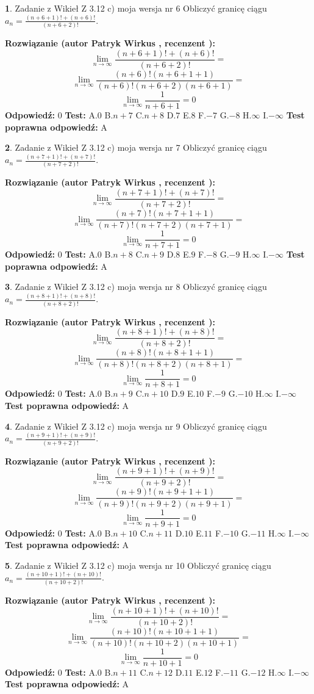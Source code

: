 \documentclass[12pt, a4paper]{article}
\theoremstyle{definition} %
\newtheorem{zad}{}
\newcommand{\zadStart}[1]{\begin{zad}#1\newline}
\newcommand{\zadStop}{\end{zad}}
\newcommand{\rozwStart}[2]{\noindent \textbf{Rozwiązanie (autor #1 , recenzent #2): }\newline}
\newcommand{\rozwStop}{\newline}
\newcommand{\odpStart}{\noindent \textbf{Odpowiedź:}\newline}
\newcommand{\odpStop}{\newline}
\newcommand{\testStart}{\noindent \textbf{Test:}\newline}
\newcommand{\testStop}{\newline}
\newcommand{\kluczStart}{\noindent \textbf{Test poprawna odpowiedź:}\newline}
\newcommand{\kluczStop}{\newline}
\begin{document}
\zadStart{Zadanie z Wikieł Z 3.12 c) moja wersja nr 6}
Obliczyć granicę ciągu $a_{n}=\frac{(n+6+1)!+(n+6)!}{(n+6+2)!}$.
\zadStop
\rozwStart{Patryk Wirkus}{}
$$\lim\limits_{n\to\infty}\frac{(n+6+1)!+(n+6)!}{(n+6+2)!}=$$
$$\lim\limits_{n\to\infty}\frac{(n+6)!(n+6+1+1)}{(n+6)!(n+6+2)(n+6+1)}=$$
$$\lim\limits_{n\to\infty}\frac{1}{n+6+1}= 0$$
\rozwStop
\odpStart
$0$
\odpStop
\testStart
A.$0$
B.$n+7$
C.$n+8$
D.$7$
E.$8$
F.$-7$
G.$-8$
H.$\infty$
I.$-\infty$
\testStop
\kluczStart
A
\kluczStop



\zadStart{Zadanie z Wikieł Z 3.12 c) moja wersja nr 7}
Obliczyć granicę ciągu $a_{n}=\frac{(n+7+1)!+(n+7)!}{(n+7+2)!}$.
\zadStop
\rozwStart{Patryk Wirkus}{}
$$\lim\limits_{n\to\infty}\frac{(n+7+1)!+(n+7)!}{(n+7+2)!}=$$
$$\lim\limits_{n\to\infty}\frac{(n+7)!(n+7+1+1)}{(n+7)!(n+7+2)(n+7+1)}=$$
$$\lim\limits_{n\to\infty}\frac{1}{n+7+1}= 0$$
\rozwStop
\odpStart
$0$
\odpStop
\testStart
A.$0$
B.$n+8$
C.$n+9$
D.$8$
E.$9$
F.$-8$
G.$-9$
H.$\infty$
I.$-\infty$
\testStop
\kluczStart
A
\kluczStop



\zadStart{Zadanie z Wikieł Z 3.12 c) moja wersja nr 8}
Obliczyć granicę ciągu $a_{n}=\frac{(n+8+1)!+(n+8)!}{(n+8+2)!}$.
\zadStop
\rozwStart{Patryk Wirkus}{}
$$\lim\limits_{n\to\infty}\frac{(n+8+1)!+(n+8)!}{(n+8+2)!}=$$
$$\lim\limits_{n\to\infty}\frac{(n+8)!(n+8+1+1)}{(n+8)!(n+8+2)(n+8+1)}=$$
$$\lim\limits_{n\to\infty}\frac{1}{n+8+1}= 0$$
\rozwStop
\odpStart
$0$
\odpStop
\testStart
A.$0$
B.$n+9$
C.$n+10$
D.$9$
E.$10$
F.$-9$
G.$-10$
H.$\infty$
I.$-\infty$
\testStop
\kluczStart
A
\kluczStop



\zadStart{Zadanie z Wikieł Z 3.12 c) moja wersja nr 9}
Obliczyć granicę ciągu $a_{n}=\frac{(n+9+1)!+(n+9)!}{(n+9+2)!}$.
\zadStop
\rozwStart{Patryk Wirkus}{}
$$\lim\limits_{n\to\infty}\frac{(n+9+1)!+(n+9)!}{(n+9+2)!}=$$
$$\lim\limits_{n\to\infty}\frac{(n+9)!(n+9+1+1)}{(n+9)!(n+9+2)(n+9+1)}=$$
$$\lim\limits_{n\to\infty}\frac{1}{n+9+1}= 0$$
\rozwStop
\odpStart
$0$
\odpStop
\testStart
A.$0$
B.$n+10$
C.$n+11$
D.$10$
E.$11$
F.$-10$
G.$-11$
H.$\infty$
I.$-\infty$
\testStop
\kluczStart
A
\kluczStop



\zadStart{Zadanie z Wikieł Z 3.12 c) moja wersja nr 10}
Obliczyć granicę ciągu $a_{n}=\frac{(n+10+1)!+(n+10)!}{(n+10+2)!}$.
\zadStop
\rozwStart{Patryk Wirkus}{}
$$\lim\limits_{n\to\infty}\frac{(n+10+1)!+(n+10)!}{(n+10+2)!}=$$
$$\lim\limits_{n\to\infty}\frac{(n+10)!(n+10+1+1)}{(n+10)!(n+10+2)(n+10+1)}=$$
$$\lim\limits_{n\to\infty}\frac{1}{n+10+1}= 0$$
\rozwStop
\odpStart
$0$
\odpStop
\testStart
A.$0$
B.$n+11$
C.$n+12$
D.$11$
E.$12$
F.$-11$
G.$-12$
H.$\infty$
I.$-\infty$
\testStop
\kluczStart
A
\kluczStop
\end{document}
